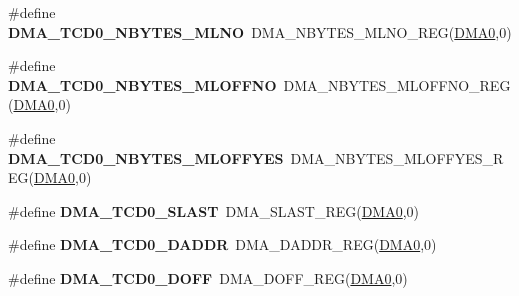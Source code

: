 \begin{DoxyCompactItemize}
\item 
\#define {\bfseries D\+M\+A\+\_\+\+T\+C\+D0\+\_\+\+N\+B\+Y\+T\+E\+S\+\_\+\+M\+L\+NO}~D\+M\+A\+\_\+\+N\+B\+Y\+T\+E\+S\+\_\+\+M\+L\+N\+O\+\_\+\+R\+EG(\hyperlink{group__DMA__Peripheral__Access__Layer_ga4103044f9ca209772f513dc694513ffb}{D\+M\+A0},0)\hypertarget{group__DMA__Register__Accessor__Macros_ga6df3a3da857eb88f77c73070f6724e5b}{}\label{group__DMA__Register__Accessor__Macros_ga6df3a3da857eb88f77c73070f6724e5b}

\item 
\#define {\bfseries D\+M\+A\+\_\+\+T\+C\+D0\+\_\+\+N\+B\+Y\+T\+E\+S\+\_\+\+M\+L\+O\+F\+F\+NO}~D\+M\+A\+\_\+\+N\+B\+Y\+T\+E\+S\+\_\+\+M\+L\+O\+F\+F\+N\+O\+\_\+\+R\+EG(\hyperlink{group__DMA__Peripheral__Access__Layer_ga4103044f9ca209772f513dc694513ffb}{D\+M\+A0},0)\hypertarget{group__DMA__Register__Accessor__Macros_ga442f8530b6e3de8a52be316ad67f398a}{}\label{group__DMA__Register__Accessor__Macros_ga442f8530b6e3de8a52be316ad67f398a}

\item 
\#define {\bfseries D\+M\+A\+\_\+\+T\+C\+D0\+\_\+\+N\+B\+Y\+T\+E\+S\+\_\+\+M\+L\+O\+F\+F\+Y\+ES}~D\+M\+A\+\_\+\+N\+B\+Y\+T\+E\+S\+\_\+\+M\+L\+O\+F\+F\+Y\+E\+S\+\_\+\+R\+EG(\hyperlink{group__DMA__Peripheral__Access__Layer_ga4103044f9ca209772f513dc694513ffb}{D\+M\+A0},0)\hypertarget{group__DMA__Register__Accessor__Macros_gac8d4550b098b51609522217ce553a037}{}\label{group__DMA__Register__Accessor__Macros_gac8d4550b098b51609522217ce553a037}

\item 
\#define {\bfseries D\+M\+A\+\_\+\+T\+C\+D0\+\_\+\+S\+L\+A\+ST}~D\+M\+A\+\_\+\+S\+L\+A\+S\+T\+\_\+\+R\+EG(\hyperlink{group__DMA__Peripheral__Access__Layer_ga4103044f9ca209772f513dc694513ffb}{D\+M\+A0},0)\hypertarget{group__DMA__Register__Accessor__Macros_ga5e23f24daf65d1eb0e6839272544261a}{}\label{group__DMA__Register__Accessor__Macros_ga5e23f24daf65d1eb0e6839272544261a}

\item 
\#define {\bfseries D\+M\+A\+\_\+\+T\+C\+D0\+\_\+\+D\+A\+D\+DR}~D\+M\+A\+\_\+\+D\+A\+D\+D\+R\+\_\+\+R\+EG(\hyperlink{group__DMA__Peripheral__Access__Layer_ga4103044f9ca209772f513dc694513ffb}{D\+M\+A0},0)\hypertarget{group__DMA__Register__Accessor__Macros_gaaa3f8d47687e097095364c5ecccf58c9}{}\label{group__DMA__Register__Accessor__Macros_gaaa3f8d47687e097095364c5ecccf58c9}

\item 
\#define {\bfseries D\+M\+A\+\_\+\+T\+C\+D0\+\_\+\+D\+O\+FF}~D\+M\+A\+\_\+\+D\+O\+F\+F\+\_\+\+R\+EG(\hyperlink{group__DMA__Peripheral__Access__Layer_ga4103044f9ca209772f513dc694513ffb}{D\+M\+A0},0)\hypertarget{group__DMA__Register__Accessor__Macros_ga660879131747c3bd7f21daa0a826b016}{}\label{group__DMA__Register__Accessor__Macros_ga660879131747c3bd7f21daa0a826b016}


\end{DoxyCompactItemize}

